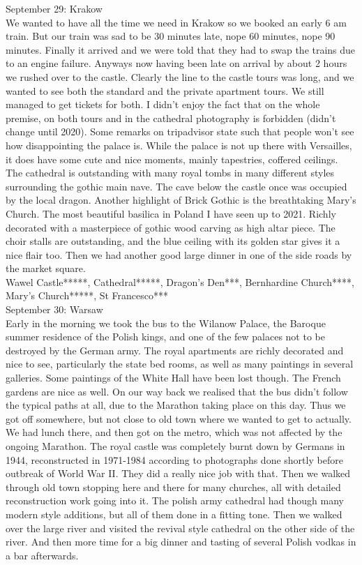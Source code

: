 September 29: Krakow\\
We wanted to have all the time we need in Krakow so we booked an early 6 am train. But our train was sad to be 30 minutes late, nope 60 minutes, nope 90 minutes. Finally it arrived and we were told that they had to swap the trains due to an engine failure. Anyways now having been late on arrival by about 2 hours we rushed over to the castle. Clearly the line to the castle tours was long, and we wanted to see both the standard and the private apartment tours. We still managed to get tickets for both. I didn't enjoy the fact that on the whole premise, on both tours and in the cathedral photography is forbidden (didn't change until 2020). Some remarks on tripadvisor state such that people won't see how disappointing the palace is. While the palace is not up there with Versailles, it does have some cute and nice moments, mainly tapestries, coffered ceilings. The cathedral is outstanding with many royal tombs in many different styles surrounding the gothic main nave. The cave below the castle once was occupied by the local dragon. Another highlight of Brick Gothic is the breathtaking Mary's Church. The most beautiful basilica in Poland I have seen up to 2021. Richly decorated with a masterpiece of gothic wood carving as high altar piece. The choir stalls are outstanding, and the blue ceiling with its golden star gives it a nice flair too. Then we had another good large dinner in one of the side roads by the market square.\\

Wawel Castle*****, Cathedral*****, Dragon's Den***, Bernhardine Church****, Mary's Church*****, St Francesco***\\

September 30: Warsaw\\
Early in the morning we took the bus to the Wilanow Palace, the Baroque summer residence of the Polish kings, and one of the few palaces not to be destroyed by the German army. The royal apartments are richly decorated and nice to see, particularly the state bed rooms, as well as many paintings in several galleries. Some paintings of the White Hall have been lost though. The French gardens are nice as well. On our way back we realised that the bus didn't follow the typical paths at all, due to the Marathon taking place on this day. Thus we got off somewhere, but not close to old town where we wanted to get to actually. We had lunch there, and then got on the metro, which was not affected by the ongoing Marathon. The royal castle was completely burnt down by Germans in 1944, reconstructed in 1971-1984 according to photographs done shortly before outbreak of World War II. They did a really nice job with that. Then we walked through old town stopping here and there for many churches, all with detailed reconstruction work going into it. The polish army cathedral had though many modern style additions, but all of them done in a fitting tone. Then we walked over the large river and visited the revival style cathedral on the other side of the river. And then more time for a big dinner and tasting of several Polish vodkas in a bar afterwards.\\ 

